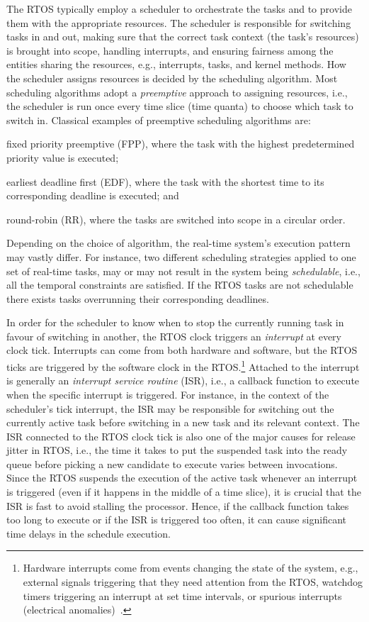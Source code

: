 The RTOS typically employ a scheduler to orchestrate the tasks and to provide them with the appropriate resources.
The scheduler is responsible for switching tasks in and out, making sure that the correct task context (the task's resources) is brought into scope, handling interrupts, and ensuring fairness among the entities sharing the resources, e.g., interrupts, tasks, and kernel methods.
How the scheduler assigns resources is decided by the scheduling algorithm.
Most scheduling algorithms adopt a \emph{preemptive} approach to assigning resources, i.e., the scheduler is run once every time slice (time quanta) to choose which task to switch in.
Classical examples of preemptive scheduling algorithms are:
%
\begin{enumerate*}[label=(\roman*)]
    \item fixed priority preemptive (FPP), where the task with the highest predetermined priority value is executed;
    \item earliest deadline first (EDF), where the task with the shortest time to its corresponding deadline is executed; and
    \item round-robin (RR), where the tasks are switched into scope in a circular order.
\end{enumerate*}
%
Depending on the choice of algorithm, the real-time system's execution pattern may vastly differ.
For instance, two different scheduling strategies applied to one set of real-time tasks, may or may not result in the system being \emph{schedulable}, i.e., all the temporal constraints are satisfied.
If the RTOS tasks are not schedulable there exists tasks overrunning their corresponding deadlines.

In order for the scheduler to know when to stop the currently running task in favour of switching in another, the RTOS clock triggers an \emph{interrupt} at every clock tick.
Interrupts can come from both hardware and software, but the RTOS ticks are triggered by the software clock in the RTOS.\footnote{Hardware interrupts come from events changing the state of the system, e.g., external signals triggering that they need attention from the RTOS, watchdog timers triggering an interrupt at set time intervals, or spurious interrupts (electrical anomalies)~\cite{Drepper:2003}.}
Attached to the interrupt is generally an \emph{interrupt service routine} (ISR), i.e., a callback function to execute when the specific interrupt is triggered.
For instance, in the context of the scheduler's tick interrupt, the ISR may be responsible for switching out the currently active task before switching in a new task and its relevant context.
The ISR connected to the RTOS clock tick is also one of the major causes for release jitter in RTOS, i.e., the time it takes to put the suspended task into the ready queue before picking a new candidate to execute varies between invocations.
Since the RTOS suspends the execution of the active task whenever an interrupt is triggered (even if it happens in the middle of a time slice), it is crucial that the ISR is fast to avoid stalling the processor.
Hence, if the callback function takes too long to execute or if the ISR is triggered too often, it can cause significant time delays in the schedule execution.

